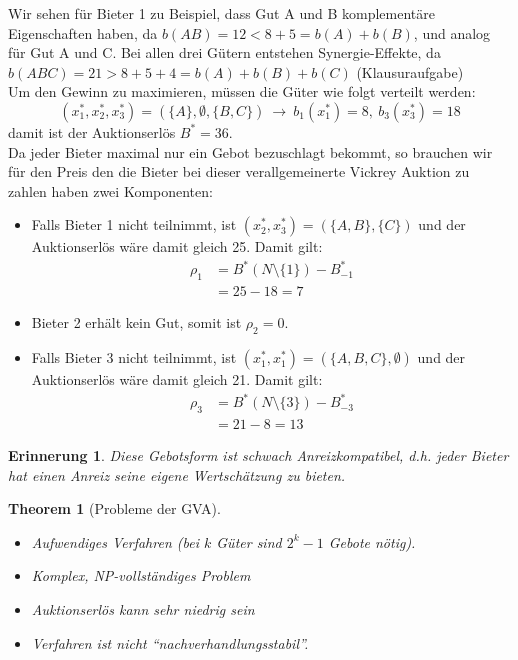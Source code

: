 \documentclass[12pt]{extreport} %
\theoremstyle{named}
\newtheorem*{unnamedtheorem*}{Theorem}
\theoremstyle{itshape}
\theoremstyle{normal}
\newtheorem*{erinnerung}{Erinnerung}
\begin{document}
Wir sehen für Bieter 1 zu Beispiel, dass Gut A und B komplementäre Eigenschaften haben, da $b(AB) = 12 < 8 + 5 = b(A) + b(B)$, und analog für Gut A und C. Bei allen drei Gütern entstehen Synergie-Effekte, da $b(ABC) = 21 > 8 + 5+ 4 = b(A) + b(B) + b(C)$ (Klausuraufgabe) ~\\

Um den Gewinn zu maximieren, müssen die Güter wie folgt verteilt werden:
$$ \left( x_1^*, x_2^*, x_3^* \right) = \left( \{ A \}, \emptyset, \{ B, C \} \right) ~ \longrightarrow ~ b_1(x_1^*) = 8,  ~b_3(x_3^*) = 18 $$
damit ist der Auktionserlös $B^{*} = 36$. ~\\


Da jeder Bieter maximal nur ein Gebot bezuschlagt bekommt, so brauchen wir für den Preis den die Bieter bei dieser verallgemeinerte Vickrey Auktion zu zahlen haben zwei Komponenten:

\begin{itemize}
	\item Falls Bieter 1 nicht teilnimmt, ist $\left( x_2^*, x_3^* \right) = \left(\{A, B \}, \{ C \} \right)$ und der Auktionserlös wäre damit gleich 25. Damit gilt:
				\begin{align*}
					\rho_1 & = B^{*} \left(N \setminus \{ 1 \} \right) - B_{-1}^{*} \\
							& = 25 - 18 = 7
				\end{align*}
	\item Bieter 2 erhält kein Gut, somit ist $\rho_2 = 0$.
	\item Falls Bieter 3 nicht teilnimmt, ist $\left( x_1^*, x_1^* \right) = \left(\{A, B, C \}, \emptyset \right)$ und der Auktionserlös wäre damit gleich 21. Damit gilt:
				\begin{align*}
					\rho_3 & = B^{*} \left(N \setminus \{ 3 \} \right) - B_{-3}^{*} \\
							& = 21 - 8 = 13
				\end{align*}			
\end{itemize}

\begin{erinnerung}
	Diese Gebotsform ist schwach Anreizkompatibel, d.h. jeder Bieter hat einen Anreiz seine eigene Wertschätzung zu bieten.
\end{erinnerung} 

\begin{unnamedtheorem*}[Probleme der GVA] ~\
	\begin{itemize}
		\item Aufwendiges Verfahren (bei $k$ Güter sind $2^{k} - 1$ Gebote nötig).
		\item Komplex, NP-vollständiges Problem %
		\item Auktionserlös kann sehr niedrig sein
		\item Verfahren ist nicht \enquote{nachverhandlungsstabil}.
	\end{itemize}
\end{unnamedtheorem*} ~\\
\end{document}
